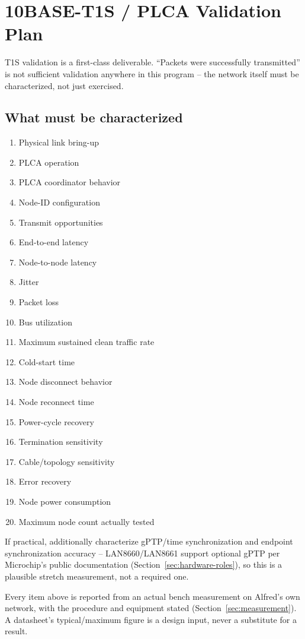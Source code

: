 \section{10BASE-T1S / PLCA Validation Plan}
\label{sec:t1s-plca}

T1S validation is a first-class deliverable. ``Packets were successfully transmitted'' is not sufficient validation anywhere in this program -- the network itself must be characterized, not just exercised.

\subsection{What must be characterized}

\begin{enumerate}[itemsep=0.05em]
\item Physical link bring-up
\item PLCA operation
\item PLCA coordinator behavior
\item Node-ID configuration
\item Transmit opportunities
\item End-to-end latency
\item Node-to-node latency
\item Jitter
\item Packet loss
\item Bus utilization
\item Maximum sustained clean traffic rate
\item Cold-start time
\item Node disconnect behavior
\item Node reconnect time
\item Power-cycle recovery
\item Termination sensitivity
\item Cable/topology sensitivity
\item Error recovery
\item Node power consumption
\item Maximum node count actually tested
\end{enumerate}

If practical, additionally characterize gPTP/time synchronization and endpoint synchronization accuracy -- LAN8660/LAN8661 support optional gPTP per Microchip's public documentation (Section~\ref{sec:hardware-roles}), so this is a plausible stretch measurement, not a required one.

\begin{decision}[title={Datasheet numbers are not measured results}]
Every item above is reported from an actual bench measurement on Alfred's own network, with the procedure and equipment stated (Section~\ref{sec:measurement}). A datasheet's typical/maximum figure is a design input, never a substitute for a result.
\end{decision}

